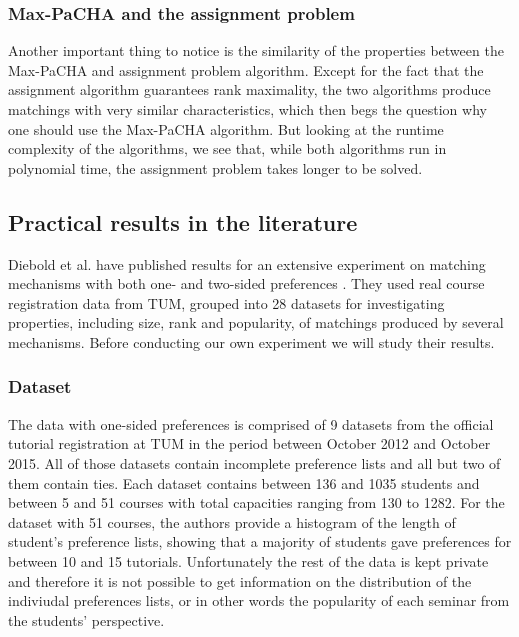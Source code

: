 \subsubsection{Max-PaCHA and the assignment problem}
Another important thing to notice is the similarity of the properties between the Max-PaCHA and assignment problem algorithm. Except for the fact that the assignment algorithm guarantees rank maximality, the two algorithms produce matchings with very similar characteristics, which then begs the question why one should use the Max-PaCHA algorithm. But looking at the runtime complexity of the algorithms, we see that, while both algorithms run in polynomial time, the assignment problem takes longer to be solved.

\subsection{Practical results in the literature}\label{sec:practical-results-lit}
Diebold et al. have published results for an extensive experiment on matching mechanisms with both one- and two-sided preferences \cite{DieboldBenchmark}. They used real course registration data from TUM, grouped into 28 datasets for investigating properties, including size, rank and popularity, of matchings produced by several mechanisms. Before conducting our own experiment we will study their results.

\subsubsection{Dataset}
The data with one-sided preferences is comprised of 9 datasets from the official tutorial registration at TUM in the period between October 2012 and October 2015. All of those datasets contain incomplete preference lists and all but two of them contain ties. Each dataset contains between 136 and 1035 students and between 5 and 51 courses with total capacities ranging from 130 to 1282. For the dataset with 51 courses, the authors provide a histogram of the length of student's preference lists, showing that a majority of students gave preferences for between 10 and 15 tutorials.\cite{DieboldBenchmark} Unfortunately the rest of the data is kept private and therefore it is not possible to get information on the distribution of the indiviudal preferences lists, or in other words the popularity of each seminar from the students' perspective.

